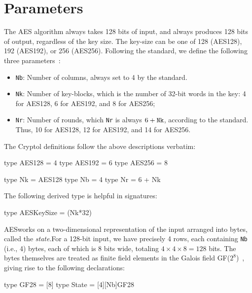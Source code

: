 \section{Parameters}
\label{sec:aesparams}

The AES algorithm always takes 128 bits of input, and always produces
128 bits of output, regardless of the key size.  The key-size can be
one of 128 (AES128), 192 (AES192), or 256 (AES256).  Following the
standard, we define the following three parameters~\cite[section
2.2]{aes}:
\begin{itemize}
\item {\tt Nb}: Number of columns, always set to 4 by the standard.
\item {\tt Nk}: Number of key-blocks, which is the number of 32-bit
  words in the key: 4 for AES128, 6 for AES192, and 8 for AES256;
\item {\tt Nr}: Number of rounds, which {\tt Nr} is always $6 +
  \mbox{\tt Nk}$, according to the standard.  Thus, 10 for AES128, 12
  for AES192, and 14 for AES256.
\end{itemize}
The Cryptol definitions follow the above descriptions verbatim:
\begin{code}
  type AES128 = 4
  type AES192 = 6
  type AES256 = 8

  type Nk = AES128
  type Nb = 4
  type Nr = 6 + Nk
\end{code}
The following derived type is helpful in signatures:
\begin{code}
  type AESKeySize = (Nk*32)
\end{code}


AES\indAES works on a two-dimensional representation of the input
arranged into bytes, called the {\em state}.\indAESState For a
128-bit input, we have precisely 4 rows, each containing {\tt Nb}
(i.e., 4) bytes, each of which is 8 bits wide, totaling
$4\times4\times8 = 128$ bits. The bytes themselves are treated as
finite field elements in the Galois field
GF($2^8$)~\cite{wiki:galoisfield}\indGF, giving rise to the following
declarations:
\begin{code}
  type GF28  = [8]
  type State = [4][Nb]GF28
\end{code}

